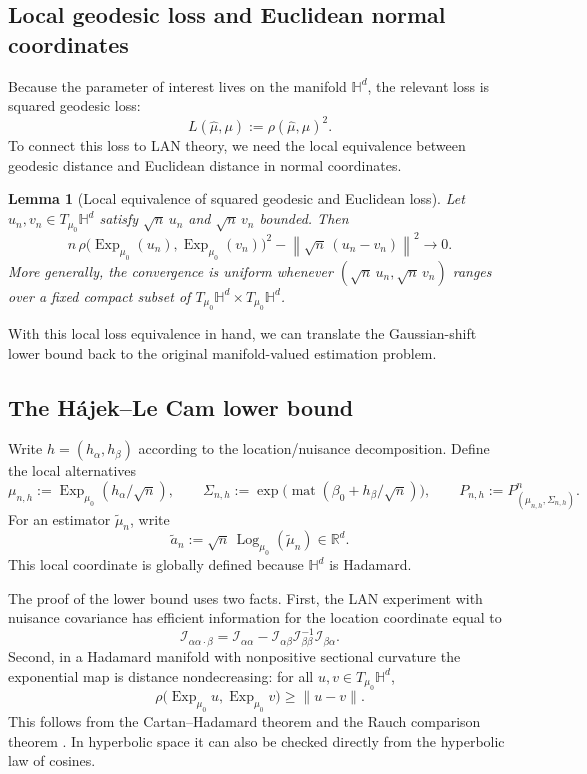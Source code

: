 \documentclass[11pt]{article}
\newtheorem{lemma}[theorem]{Lemma}
\DeclareMathOperator{\mat}{mat}
\newcommand{\R}{\mathbb{R}}
\newcommand{\Hh}{\mathbb{H}}
\newcommand{\Exp}{\operatorname{Exp}}
\newcommand{\Log}{\operatorname{Log}}
\newcommand{\norm}[1]{\left\lVert #1\right\rVert}
\newcommand{\info}{\mathcal{I}}
\newcommand{\HajekLecam}{H\'ajek--Le Cam\xspace}
\begin{document}
\subsection{Local geodesic loss and Euclidean normal coordinates}

Because the parameter of interest lives on the manifold $\Hh^d$, the relevant loss is squared geodesic loss:
\[
L(\hat\mu,\mu):=\rho(\hat\mu,\mu)^2.
\]
To connect this loss to LAN theory, we need the local equivalence between geodesic distance and Euclidean distance in normal coordinates.

\begin{lemma}[Local equivalence of squared geodesic and Euclidean loss]
\label{lem:loss-equivalence}
Let $u_n,v_n\in T_{\mu_0}\Hh^d$ satisfy $\sqrt n\,u_n$ and $\sqrt n\,v_n$ bounded. Then
\[
n\,\rho\bigl(\Exp_{\mu_0}(u_n),\Exp_{\mu_0}(v_n)\bigr)^2
-
\norm{\sqrt n\,(u_n-v_n)}^2
\to 0.
\]
More generally, the convergence is uniform whenever $(\sqrt n\,u_n,\sqrt n\,v_n)$ ranges over a fixed compact subset of $T_{\mu_0}\Hh^d\times T_{\mu_0}\Hh^d$.
\end{lemma}
With this local loss equivalence in hand, we can translate the Gaussian-shift lower bound back to the original manifold-valued estimation problem.




\subsection{The \HajekLecam lower bound}

Write $h=(h_\alpha,h_\beta)$ according to the location/nuisance decomposition. Define the local alternatives
\[
\mu_{n,h}:=\Exp_{\mu_0}(h_\alpha/\sqrt n),
\qquad
\Sigma_{n,h}:=\exp\bigl(\mat(\beta_0+h_\beta/\sqrt n)\bigr),
\qquad
P_{n,h}:=P_{(\mu_{n,h},\Sigma_{n,h})}^n .
\]
For an estimator $\tilde\mu_n$, write
\[
\tilde a_n:=\sqrt n\,\Log_{\mu_0}(\tilde\mu_n)\in\R^d .
\]
This local coordinate is globally defined because $\Hh^d$ is Hadamard.

The proof of the lower bound uses two facts. First, the LAN experiment with nuisance covariance has efficient information for the location coordinate equal to
\[
\info_{\alpha\alpha\cdot\beta}
=
\info_{\alpha\alpha}-\info_{\alpha\beta}\info_{\beta\beta}^{-1}\info_{\beta\alpha}.
\]
Second, in a Hadamard manifold with nonpositive sectional curvature the exponential map is distance nondecreasing: for all $u,v\in T_{\mu_0}\Hh^d$,
\begin{equation}
\label{eq:exp-nondecreasing}
\rho\bigl(\Exp_{\mu_0}u,\Exp_{\mu_0}v\bigr)\ge \|u-v\|.
\end{equation}
This follows from the Cartan--Hadamard theorem and the Rauch comparison theorem \citep{docarmo_1992_RiemannianGeometry}. In  hyperbolic space it can also be checked directly from the hyperbolic law of cosines.
\end{document}
